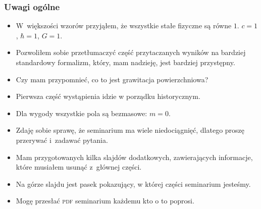 \documentclass[10pt,t]{beamer}
\begin{document}
\begin{frame}
  \frametitle{Uwagi ogólne}


  \begin{itemize}

  \item W~większości wzorów przyjąłem, że wszystkie stałe fizyczne są
    równe $1$. $c = 1$, $\hbar = 1$, $G = 1$.

  \item Pozwoliłem sobie przetłumaczyć część przytaczanych wyników na
    bardziej standardowy formalizm, który, mam nadzieję, jest bardziej
    przystępny.

  \item Czy mam przypomnieć, co to jest grawitacja powierzchniowa?

  \item Pierwsza część wystąpienia idzie w porządku historycznym.

  \item Dla wygody wszystkie pola są bezmasowe: $m = 0$.

  \item Zdaję sobie sprawę, że seminarium ma wiele niedociągnięć,
    dlatego proszę przerywać i~zadawać pytania.

  \item Mam przygotowanych kilka slajdów dodatkowych, zawierających
    informacje, które musiałem usunąć z~głównej części.

  \item Na górze slajdu jest pasek pokazujący, w której części
    seminarium jesteśmy.

  \item Mogę przesłać \textsc{pdf} seminarium każdemu kto o to
    poprosi.

  \end{itemize}

\end{frame}
\end{document}

